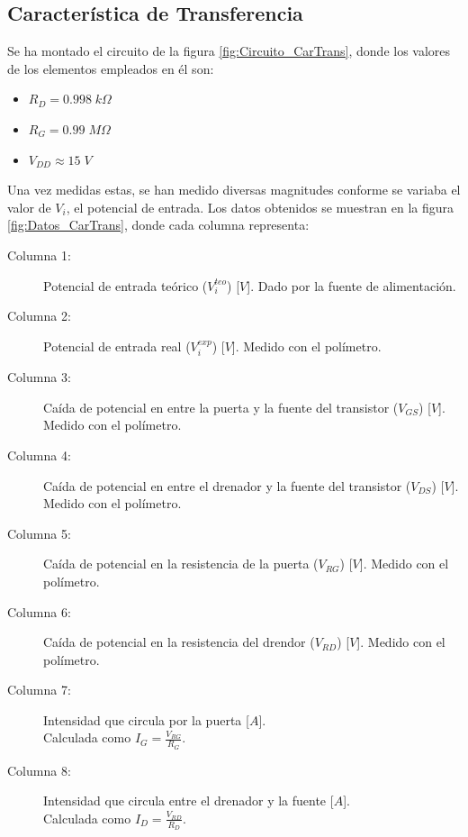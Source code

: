 \subsection{Característica de Transferencia}
Se ha montado el circuito de la figura \ref{fig:Circuito_CarTrans}, donde los valores de los elementos empleados en él son:
\begin{itemize}
    \item $R_D = 0.998\;k\Omega$
    \item $R_G = 0.99\;M\Omega$
    \item $V_{DD} \approx 15\;V$
\end{itemize}
Una vez medidas estas, se han medido diversas magnitudes conforme se variaba el valor de $V_i$, el potencial de entrada. Los datos obtenidos se muestran en la figura \ref{fig:Datos_CarTrans}, donde cada columna representa:
\begin{description}
    \item [Columna 1:] Potencial de entrada teórico ($V_i^{teo}$) [$V$]. Dado por la fuente de alimentación.
    \item [Columna 2:] Potencial de entrada real ($V_i^{exp}$) [$V$]. Medido con el polímetro.
    \item [Columna 3:] Caída de potencial en entre la puerta y la fuente del transistor ($V_{GS}$) [$V$]. Medido con el polímetro.
    \item [Columna 4:] Caída de potencial en entre el drenador y la fuente del transistor ($V_{DS}$) [$V$]. Medido con el polímetro.
    \item [Columna 5:] Caída de potencial en la resistencia de la puerta ($V_{RG}$) [$V$]. Medido con el polímetro.
    \item [Columna 6:] Caída de potencial en la resistencia del drendor ($V_{RD}$) [$V$]. Medido con el polímetro.
    \item [Columna 7:] Intensidad que circula por la puerta [$A$].\\ Calculada como $I_G = \frac{V_{RG}}{R_G}$.
    \item [Columna 8:] Intensidad que circula entre el drenador y la fuente [$A$].\\ Calculada como $I_D = \frac{V_{RD}}{R_D}$.
\end{description}

